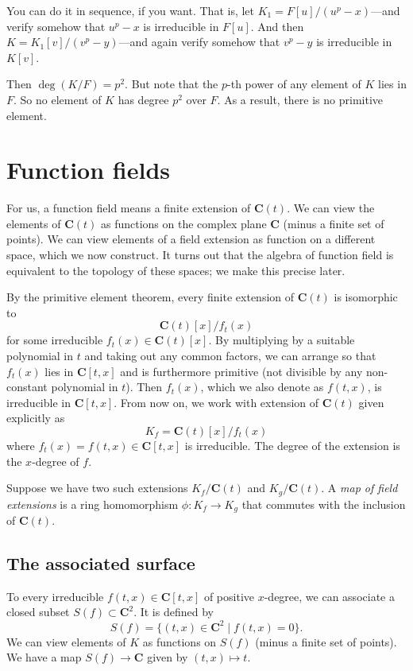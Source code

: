 \documentclass[11pt]{article}
\begin{document}
You can do it in sequence, if you want. 
That is, let \(K_1 = F[u]/(u^p-x)\)---and verify somehow that \(u^p-x\) is irreducible in \(F[u]\).
And then \(K = K_1[v]/(v^p-y)\)---and again verify somehow that \(v^p-y\) is irreducible in \(K[v]\).

Then \(\deg(K/F) = p^2\).
But note that the \(p\)-th power of any element of \(K\) lies in \(F\).
So no element of \(K\) has degree \(p^2\) over \(F\).
As a result, there is no primitive element.
\section{Function fields}
\label{sec:org2529d4a}
For us, a function field means a finite extension of \(\mathbf{C}(t)\).
We can view the elements of \(\mathbf{C}(t)\) as functions on the complex plane \(\mathbf{C}\) (minus a finite set of points).
We can view elements of a field extension as function on a different space, which we now construct.
It turns out that the algebra of function field is equivalent to the topology of these spaces; we make this precise later.

By the primitive element theorem, every finite extension of \(\mathbf{C}(t)\) is isomorphic to
\[ \mathbf{C}(t)[x]/f_t(x)\]
for some irreducible \(f_t(x) \in \mathbf{C}(t)[x]\).
By multiplying by a suitable polynomial in \(t\) and taking out any common factors, we can arrange so that \(f_t(x)\) lies in \(\mathbf{C}[t,x]\) and is furthermore primitive (not divisible by any non-constant polynomial in \(t\)).
Then \(f_t(x)\), which we also denote as \(f(t,x)\), is irreducible in \(\mathbf{C}[t,x]\).
From now on, we work with extension of \(\mathbf{C}(t)\) given explicitly as
\[ K_{f} = \mathbf{C}(t)[x]/f_t(x)\]
where \(f_t(x) = f(t,x)\in \mathbf{C}[t,x]\) is irreducible.
The degree of the extension is the \(x\)-degree of \(f\).

Suppose we have two such extensions \(K_f / \mathbf{C}(t)\) and \(K_g / \mathbf{C}(t)\).
A \emph{map of field extensions} is a ring homomorphism \(\phi \colon K_f \to K_g\) that commutes with the inclusion of \(\mathbf{C}(t)\).
\subsection{The associated surface}
\label{sec:orgd8afaa6}
To every irreducible \(f(t,x) \in \mathbf{C}[t,x]\) of positive \(x\)-degree, we can associate a closed subset \(S(f) \subset \mathbf{C}^2\).
It is defined by
\[ S(f) = \{(t,x) \in \mathbf{C}^2 \mid f(t,x) = 0\}.\]
We can view elements of \(K\) as functions on \(S(f)\) (minus a finite set of points).
We have a map \(S(f) \to \mathbf{C}\) given by \((t,x) \mapsto t\).
\end{document}
